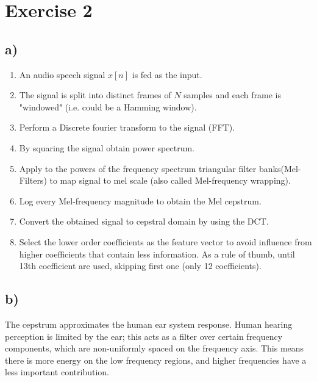 \section*{Exercise 2} %
\label{sec:section_name}

\subsection*{a)} %
\label{sub:a}

\begin{enumerate}
	\item An audio speech signal $x[n]$ is fed as the input.
	\item The signal is split into distinct frames of $N$ samples and each frame is "windowed" (i.e. could be a Hamming window).
	\item Perform a Discrete fourier transform to the signal (FFT).
	\item By squaring the signal obtain power spectrum.
	\item Apply to the powers of the frequency spectrum triangular filter banks(Mel-Filters) to map signal to mel scale (also called Mel-frequency wrapping).
	\item Log every Mel-frequency magnitude to obtain the Mel cepstrum.
	\item Convert the obtained signal to cepstral domain by using the  DCT.
	\item Select the lower order coefficients as the feature vector to avoid influence from higher coefficients that contain less information. As a rule of thumb, until 13th coefficient are used, skipping first one (only 12 coefficients).
\end{enumerate}



\subsection*{b)} %
\label{sub:b}

The cepstrum approximates the human ear system response. Human hearing perception is limited by the ear; this acts as a filter over certain frequency components, which are non-uniformly spaced on the frequency axis. This means there is more energy on the low frequency regions, and higher frequencies have a less important contribution.


